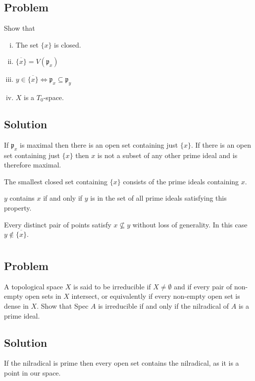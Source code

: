 \documentclass[book,12pt,oneside,openany]{memoir}
\begin{document}
\section{}
\subsection{Problem}
Show that
\begin{enumerate}[i)]
\item The set $\{x\}$ is closed.
\item $\overline{\{x\}}=V(\mathfrak p_x)$
\item $y\in \overline{\{x\}}\iff \mathfrak p_x \subseteq \mathfrak p_y$
\item $X$ is a $T_0$-space.
\end{enumerate}
\subsection{Solution}
If $\mathfrak p_x$ is maximal then there is an open set containing just
$\{x\}$.
If there is an open set containing just $\{x\}$ then $x$ is not a subset
of any other prime ideal and is therefore maximal.

The smallest closed set containing $\{x\}$ consists of the prime ideals
containing $x$.

$y$ contains $x$ if and only if $y$ is in the set of all prime ideals
satisfying this property.

Every distinct pair of points satisfy $x \not \subseteq y$ without loss of
generality.
In this case $y \not\in \overline{\{x\}}$.


\section{}
\subsection{Problem}
A topological space $X$ is said to be irreducible if $X \neq \emptyset$ and if every pair of non-empty open sets in $X$ intersect, or equivalently if every non-empty open set is dense in $X$. Show that Spec $A$ is irreducible if and only if the nilradical of $A$ is a prime ideal.
\subsection{Solution}
If the nilradical is prime then every open set contains the nilradical,
as it is a point in our space.
\end{document}

